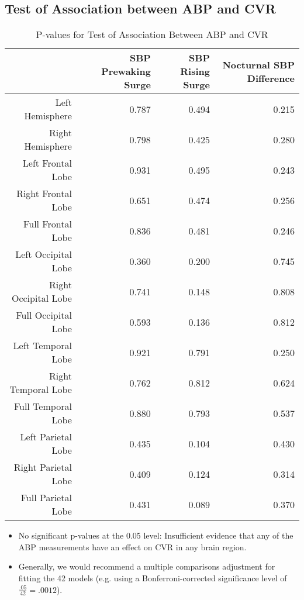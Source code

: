 \documentclass[10pt]{article}\usepackage[]{graphicx}\usepackage[]{color}
\begin{document}
\clearpage
\subsection{Test of Association between ABP and CVR}


\begin{table}[ht]
\centering
\caption{P-values for Test of Association Between ABP and CVR} 
\begin{tabular}{rrrr}
  \toprule
 & SBP Prewaking Surge & SBP Rising Surge & Nocturnal SBP Difference \\ 
  \midrule
Left Hemisphere & 0.787 & 0.494 & 0.215 \\ 
  Right Hemisphere & 0.798 & 0.425 & 0.280 \\ 
  Left Frontal Lobe & 0.931 & 0.495 & 0.243 \\ 
  Right Frontal Lobe & 0.651 & 0.474 & 0.256 \\ 
  Full Frontal Lobe & 0.836 & 0.481 & 0.246 \\ 
  Left Occipital Lobe & 0.360 & 0.200 & 0.745 \\ 
  Right Occipital Lobe & 0.741 & 0.148 & 0.808 \\ 
  Full Occipital Lobe & 0.593 & 0.136 & 0.812 \\ 
  Left Temporal Lobe & 0.921 & 0.791 & 0.250 \\ 
  Right Temporal Lobe & 0.762 & 0.812 & 0.624 \\ 
  Full Temporal Lobe & 0.880 & 0.793 & 0.537 \\ 
  Left Parietal Lobe & 0.435 & 0.104 & 0.430 \\ 
  Right Parietal Lobe & 0.409 & 0.124 & 0.314 \\ 
  Full Parietal Lobe & 0.431 & 0.089 & 0.370 \\ 
   \bottomrule
\end{tabular}
\end{table}


\begin{itemize}
  \item No significant p-values at the 0.05 level: Insufficient evidence that any of the ABP measurements have an effect on CVR in any brain region.
  \item Generally, we would recommend a multiple comparisons adjustment for fitting the 42 models (e.g. using a Bonferroni-corrected significance level of $\frac{.05}{42} = .0012$). 
\end{itemize}
\end{document}
